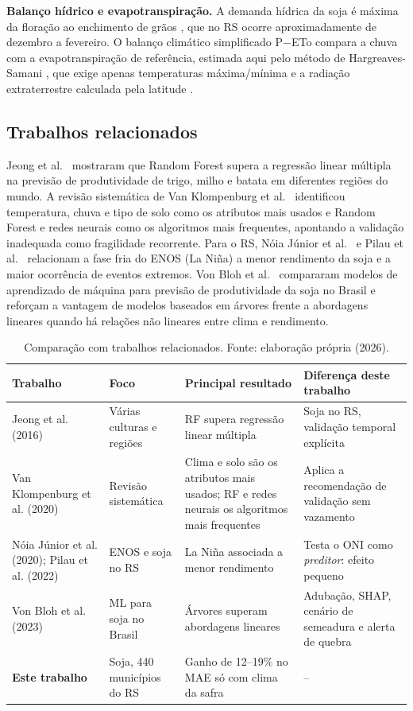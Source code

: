 \documentclass[12pt]{article}
\begin{document}
\textbf{Balanço hídrico e evapotranspiração.} A demanda hídrica da soja é
máxima da floração ao enchimento de grãos \cite{farias2007}, que no RS
ocorre aproximadamente de dezembro a fevereiro. O balanço climático
simplificado P$-$ETo compara a chuva com a evapotranspiração de referência,
estimada aqui pelo método de Hargreaves-Samani \cite{hargreaves1985}, que
exige apenas temperaturas máxima/mínima e a radiação extraterrestre
calculada pela latitude \cite{allen1998}.

\subsection{Trabalhos relacionados}

Jeong et al.~\cite{jeong2016} mostraram que Random Forest supera a
regressão linear múltipla na previsão de produtividade de trigo, milho e
batata em diferentes regiões do mundo. A revisão sistemática de Van
Klompenburg et al.~\cite{vanklompenburg2020} identificou temperatura,
chuva e tipo de solo como os atributos mais usados e Random Forest e redes
neurais como os algoritmos mais frequentes, apontando a validação
inadequada como fragilidade recorrente. Para o RS, Nóia Júnior et
al.~\cite{noia2020} e Pilau et al.~\cite{pilau2022} relacionam a fase
fria do ENOS (La Niña) a menor rendimento da soja e a maior ocorrência de
eventos extremos. Von Bloh et al.~\cite{vonbloh2023} compararam modelos
de aprendizado de máquina para previsão de produtividade da soja no Brasil
e reforçam a vantagem de modelos baseados em árvores frente a abordagens
lineares quando há relações não lineares entre clima e rendimento.

\begin{table}[ht]
\centering
\caption{Comparação com trabalhos relacionados. Fonte: elaboração própria (2026).}
\label{tab:relacionados}
\footnotesize
\begin{tabular}{|p{2.6cm}|p{2.7cm}|p{4.0cm}|p{3.6cm}|}
\hline
\textbf{Trabalho} & \textbf{Foco} & \textbf{Principal resultado} & \textbf{Diferença deste trabalho} \\ \hline
Jeong et al. (2016) & Várias culturas e regiões & RF supera regressão linear múltipla & Soja no RS, validação temporal explícita \\ \hline
Van Klompenburg et al. (2020) & Revisão sistemática & Clima e solo são os atributos mais usados; RF e redes neurais os algoritmos mais frequentes & Aplica a recomendação de validação sem vazamento \\ \hline
Nóia Júnior et al. (2020); Pilau et al. (2022) & ENOS e soja no RS & La Niña associada a menor rendimento & Testa o ONI como \emph{preditor}: efeito pequeno \\ \hline
Von Bloh et al. (2023) & ML para soja no Brasil & Árvores superam abordagens lineares & Adubação, SHAP, cenário de semeadura e alerta de quebra \\ \hline
\textbf{Este trabalho} & Soja, 440 municípios do RS & Ganho de 12--19\% no MAE só com clima da safra & -- \\ \hline
\end{tabular}
\end{table}
\end{document}
